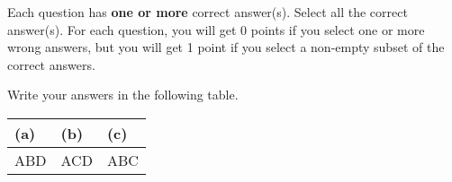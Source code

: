 
Each question has \textbf{one or more} correct answer(s). Select all the correct answer(s). For each question, you will get 0 points if you select one or more wrong answers, but you will get 1 point if you select a non-empty subset of the correct answers.

Write your answers in the following table.


\begin{table}[htbp]
    \centering
    \begin{tabular}{|p{2cm}|p{2cm}|p{2cm}|}
        \hline
        (a) & (b) & (c)                \\
        \hline
        ABD & ACD & ABC \vspace{0.4cm} \\
        \hline
    \end{tabular}
\end{table}

